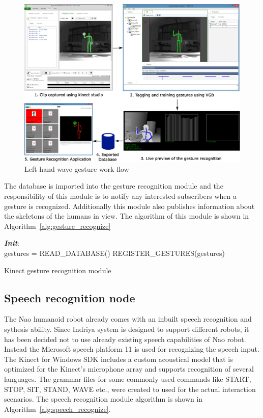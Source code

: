 \begin{figure}[H]
\centering
\includegraphics[width=\textwidth]{assets/gesture_recog_flow.eps}
\caption[Left hand wave gesture work flow]{Left hand wave gesture work flow}
\label{fig:gesture_waveleft}
\end{figure}
The database is imported into the gesture recognition module and the responsibility of this module is to notify any interested subscribers when a gesture is recognized. Additionally this module also publishes information about the skeletons of the humans in view. The algorithm of this module is shown in Algorithm~\ref{alg:gesture_recognize}

\begin{algorithm}[H]
 \textbf{\emph{Init}}:\\
 \quad gestures = READ\_DATABASE()\;
 \quad REGISTER\_GESTURES(gestures)\;
 \caption{Kinect gesture recognition module}
 \label{alg:gesture_recognize}
\end{algorithm}
\subsection{Speech recognition node}
The Nao humanoid robot already comes with an inbuilt speech recognition and sythesis ability. Since Indriya system is designed to support different robots, it has been decided not to use already existing speech capabilities of Nao robot. Instead the Microsoft speech platform 11 is used for recognizing the speech input. The Kinect for Windows SDK includes a custom acoustical model that is optimized for the Kinect's microphone array and supports recognition of several languages. The grammar files for some commonly used commands like START, STOP, SIT, STAND, WAVE etc., were created to used for the actual interaction scenarios. The speech recognition module algorithm is shown in Algorithm~\ref{alg:speech_recognize}.

